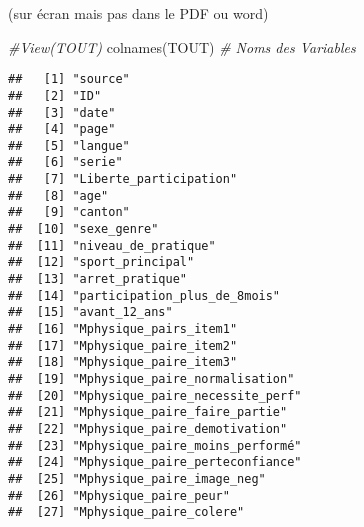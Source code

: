 \documentclass[
]{article}
\newenvironment{Shaded}{\begin{snugshade}}{\end{snugshade}}
\newcommand{\CommentTok}[1]{\textcolor[rgb]{0.56,0.35,0.01}{\textit{#1}}}
\newcommand{\FunctionTok}[1]{\textcolor[rgb]{0.00,0.00,0.00}{#1}}
\newcommand{\NormalTok}[1]{#1}
\begin{document}
(sur écran mais pas dans le PDF ou word)

\begin{Shaded}
\begin{Highlighting}[]
\CommentTok{\#View(TOUT)}
\FunctionTok{colnames}\NormalTok{(TOUT)   }\CommentTok{\# Noms des Variables}
\end{Highlighting}
\end{Shaded}

\begin{verbatim}
##   [1] "source"                                                            
##   [2] "ID"                                                                
##   [3] "date"                                                              
##   [4] "page"                                                              
##   [5] "langue"                                                            
##   [6] "serie"                                                             
##   [7] "Liberte_participation"                                             
##   [8] "age"                                                               
##   [9] "canton"                                                            
##  [10] "sexe_genre"                                                        
##  [11] "niveau_de_pratique"                                                
##  [12] "sport_principal"                                                   
##  [13] "arret_pratique"                                                    
##  [14] "participation_plus_de_8mois"                                       
##  [15] "avant_12_ans"                                                      
##  [16] "Mphysique_pairs_item1"                                             
##  [17] "Mphysique_paire_item2"                                             
##  [18] "Mphysique_paire_item3"                                             
##  [19] "Mphysique_paire_normalisation"                                     
##  [20] "Mphysique_paire_necessite_perf"                                    
##  [21] "Mphysique_paire_faire_partie"                                      
##  [22] "Mphysique_paire_demotivation"                                      
##  [23] "Mphysique_paire_moins_performé"                                    
##  [24] "Mphysique_paire_perteconfiance"                                    
##  [25] "Mphysique_paire_image_neg"                                         
##  [26] "Mphysique_paire_peur"                                              
##  [27] "Mphysique_paire_colere"                                            

\end{verbatim}
\end{document}
